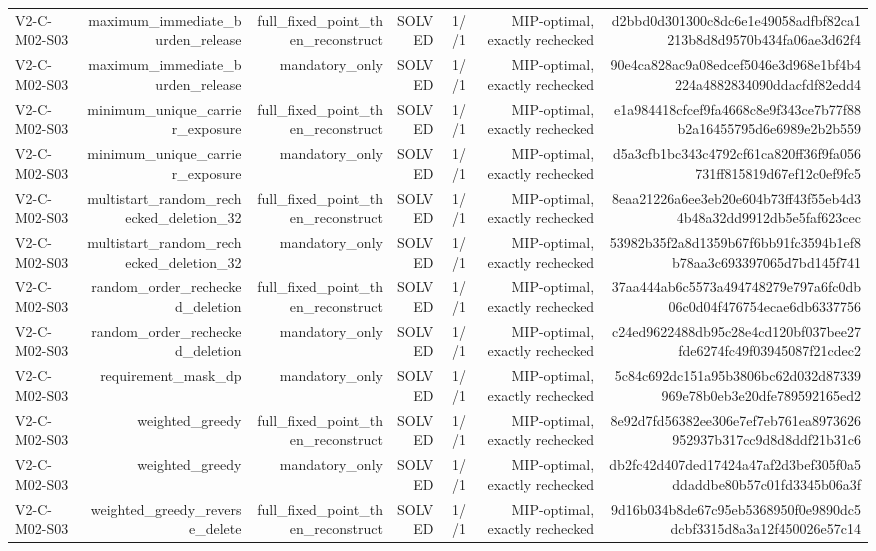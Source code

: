 {\begin{longtable}{lrrrrrr}
V2-C-M02-S03 & maximum\_immediate\_burden\_release & full\_fixed\_point\_then\_reconstruct & SOLVED & 1//1 & MIP-optimal, exactly rechecked & d2bbd0d301300c8dc6e1e49058adfbf82ca1213b8d8d9570b434fa06ae3d62f4 \\
V2-C-M02-S03 & maximum\_immediate\_burden\_release & mandatory\_only & SOLVED & 1//1 & MIP-optimal, exactly rechecked & 90e4ca828ac9a08edcef5046e3d968e1bf4b4224a4882834090ddacfdf82edd4 \\
V2-C-M02-S03 & minimum\_unique\_carrier\_exposure & full\_fixed\_point\_then\_reconstruct & SOLVED & 1//1 & MIP-optimal, exactly rechecked & e1a984418cfcef9fa4668c8e9f343ce7b77f88b2a16455795d6e6989e2b2b559 \\
V2-C-M02-S03 & minimum\_unique\_carrier\_exposure & mandatory\_only & SOLVED & 1//1 & MIP-optimal, exactly rechecked & d5a3cfb1bc343c4792cf61ca820ff36f9fa056731ff815819d67ef12c0ef9fc5 \\
V2-C-M02-S03 & multistart\_random\_rechecked\_deletion\_32 & full\_fixed\_point\_then\_reconstruct & SOLVED & 1//1 & MIP-optimal, exactly rechecked & 8eaa21226a6ee3eb20e604b73ff43f55eb4d34b48a32dd9912db5e5faf623cec \\
V2-C-M02-S03 & multistart\_random\_rechecked\_deletion\_32 & mandatory\_only & SOLVED & 1//1 & MIP-optimal, exactly rechecked & 53982b35f2a8d1359b67f6bb91fc3594b1ef8b78aa3c693397065d7bd145f741 \\
V2-C-M02-S03 & random\_order\_rechecked\_deletion & full\_fixed\_point\_then\_reconstruct & SOLVED & 1//1 & MIP-optimal, exactly rechecked & 37aa444ab6c5573a494748279e797a6fc0db06c0d04f476754ecae6db6337756 \\
V2-C-M02-S03 & random\_order\_rechecked\_deletion & mandatory\_only & SOLVED & 1//1 & MIP-optimal, exactly rechecked & c24ed9622488db95c28e4cd120bf037bee27fde6274fc49f03945087f21cdec2 \\
V2-C-M02-S03 & requirement\_mask\_dp & mandatory\_only & SOLVED & 1//1 & MIP-optimal, exactly rechecked & 5c84c692dc151a95b3806bc62d032d87339969e78b0eb3e20dfe789592165ed2 \\
V2-C-M02-S03 & weighted\_greedy & full\_fixed\_point\_then\_reconstruct & SOLVED & 1//1 & MIP-optimal, exactly rechecked & 8e92d7fd56382ee306e7ef7eb761ea8973626952937b317cc9d8d8ddf21b31c6 \\
V2-C-M02-S03 & weighted\_greedy & mandatory\_only & SOLVED & 1//1 & MIP-optimal, exactly rechecked & db2fc42d407ded17424a47af2d3bef305f0a5ddaddbe80b57c01fd3345b06a3f \\
V2-C-M02-S03 & weighted\_greedy\_reverse\_delete & full\_fixed\_point\_then\_reconstruct & SOLVED & 1//1 & MIP-optimal, exactly rechecked & 9d16b034b8de67c95eb5368950f0e9890dc5dcbf3315d8a3a12f450026e57c14 \\

\end{longtable}}
